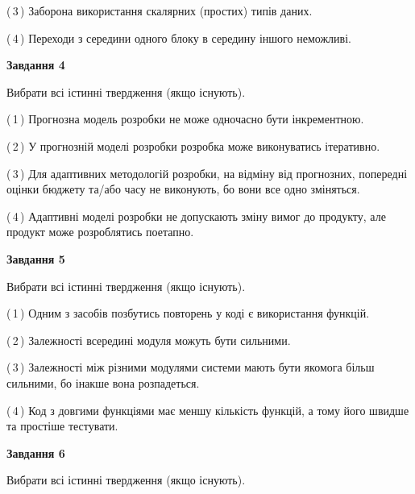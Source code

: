 \documentclass[10pt, ukrainian]{article}
\begin{document}
{\begin {large}
(\,3\,) Заборона використання скалярних (простих) типів даних. %



(\,4\,) Переходи з середини одного блоку в середину іншого неможливі. %


{\begin {center}\textbf{Завдання 4}\end {center}}\par
Вибрати всі істинні твердження (якщо існують).\par
\vspace{2mm}



(\,1\,) Прогнозна модель розробки не може одночасно бути інкрементною. %



(\,2\,) У прогнозній моделі розробки розробка може виконуватись ітеративно. %



(\,3\,) Для адаптивних методологій розробки, на відміну від прогнозних, попередні оцінки бюджету та/або часу не виконують, бо вони все одно зміняться. %



(\,4\,) Адаптивні моделі розробки не допускають зміну вимог до продукту, але продукт може розроблятись поетапно. %


{\begin {center}\textbf{Завдання 5}\end {center}}\par
Вибрати всі істинні твердження (якщо існують).\par
\vspace{2mm}



(\,1\,) Одним з засобів позбутись повторень у коді є використання функцій. %



(\,2\,) Залежності всередині модуля можуть бути сильними. %



(\,3\,) Залежності між різними модулями системи мають бути якомога більш сильними, бо інакше вона розпадеться. %



(\,4\,) Код з довгими функціями має меншу кількість функцій, а тому його швидше та простіше тестувати. %

\newpage

{\begin {center}\textbf{Завдання 6}\end {center}}\par
Вибрати всі істинні твердження (якщо існують).\par
\vspace{2mm}




\end{large}}
\end{document}
